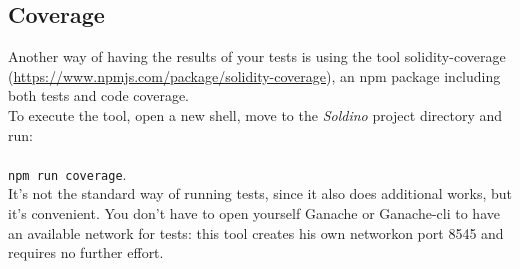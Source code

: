 \subsection{Coverage}
Another way of having the results of your tests is using the tool solidity-coverage (\url{https://www.npmjs.com/package/solidity-coverage}), an npm package including both tests and code coverage.\\
To execute the tool, open a new shell, move to the \textit{Soldino} project directory and run: \\ \\ \texttt{npm run coverage}.\\
It's not the standard way of running tests, since it also does additional works, but it's convenient. You don't have to open yourself Ganache or Ganache-cli to have an available network for tests: this tool creates his own networkon port 8545 and requires no further effort.
